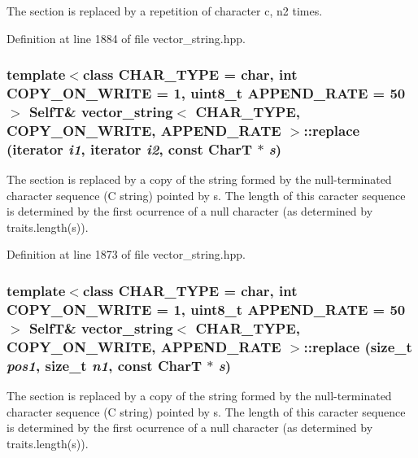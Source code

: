 The section is replaced by a repetition of character c, n2 times. 

Definition at line 1884 of file vector\_\-string.hpp.\hypertarget{classvector__string_17c5332dcb5ab7354aaef88da5238f88}{
\subsubsection[{replace}]{\setlength{\rightskip}{0pt plus 5cm}template$<$class CHAR\_\-TYPE  = char, int COPY\_\-ON\_\-WRITE = 1, uint8\_\-t APPEND\_\-RATE = 50$>$ {\bf SelfT}\& {\bf vector\_\-string}$<$ CHAR\_\-TYPE, COPY\_\-ON\_\-WRITE, APPEND\_\-RATE $>$::replace (iterator {\em i1}, \/  iterator {\em i2}, \/  const CharT $\ast$ {\em s})}}
\label{classvector__string_17c5332dcb5ab7354aaef88da5238f88}


The section is replaced by a copy of the string formed by the null-terminated character sequence (C string) pointed by s. The length of this caracter sequence is determined by the first ocurrence of a null character (as determined by traits.length(s)). 

Definition at line 1873 of file vector\_\-string.hpp.\hypertarget{classvector__string_37ba405b4c07993127d537b60885a57a}{
\subsubsection[{replace}]{\setlength{\rightskip}{0pt plus 5cm}template$<$class CHAR\_\-TYPE  = char, int COPY\_\-ON\_\-WRITE = 1, uint8\_\-t APPEND\_\-RATE = 50$>$ {\bf SelfT}\& {\bf vector\_\-string}$<$ CHAR\_\-TYPE, COPY\_\-ON\_\-WRITE, APPEND\_\-RATE $>$::replace (size\_\-t {\em pos1}, \/  size\_\-t {\em n1}, \/  const CharT $\ast$ {\em s})}}
\label{classvector__string_37ba405b4c07993127d537b60885a57a}


The section is replaced by a copy of the string formed by the null-terminated character sequence (C string) pointed by s. The length of this caracter sequence is determined by the first ocurrence of a null character (as determined by traits.length(s)). 

